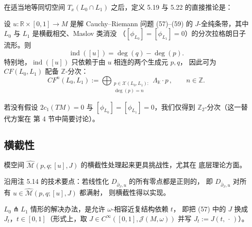 在适当地等同切空间 $T_x(L_0\cap L_1)$ 之后，定义 5.19 与 5.22 的直接推论是：

\begin{Cor}\label{cor:5.23}
设 $u:\mathbb R\times[0,1]\to M$ 是解 Cauchy--Riemann 问题 (57)--(59) 的
$J$-全纯条带，其中 $L_0$ 与 $L_1$ 是横截相交、Maslov 类消没
（$[\phi_{L_0}]=[\phi_{L_1}]=0$）的分次拉格朗日子流形。则
\[
\operatorname{ind}([u])=\deg(q)-\deg(p).
\]
特别地，$\operatorname{ind}([u])$ 只依赖于由 $u$ 相连的两个生成元 $p,q$，
因此可为 $CF(L_0,L_1)$ 配备 $\mathbb Z$-分次：
\[
CF^n(L_0,L_1):=\bigoplus_{\substack{p\in\mathcal X(L_0,L_1):\\
\deg(p)=n}}\Lambda_{\mathbb K}\cdot p\,,
\qquad n\in\mathbb Z.
\]
\end{Cor}


若没有假设 $2c_1(TM)=0$ 与 $[\phi_{L_0}]=[\phi_{L_1}]=0$，我们仅得到
$\mathbb Z_2$-分次（这一替代方案在 \cite{Sei99} 第 4 节中简要讨论）。

\medskip
\noindent{}
\medskip

\subsection{横截性}\label{sec:5.5}

模空间 $\widehat{\mathcal M}(p,q;[u],J)$ 的横截性处理起来更具挑战性，尤其在
底层理论方面。

\begin{Rem}\label{rem:5.24}
沿用注 5.14 的技术要点：若线性化 $D_{\bar\partial_J,u}$ 的所有零点都是正则的，
即 $D_{\bar\partial_J,u}$ 对所有 $u\in\widehat{\mathcal M}(p,q;[u],J)$ 都满射，
则横截性得以实现。
\end{Rem}

$L_0\pitchfork L_1$ 情形的解决办法，是允许 $\omega$-相容近复结构依赖 $t$，
即把 (57) 中的 $J$ 换成 $J_t$，$t\in[0,1]$（形式上，取
$J\in C^\infty([0,1],\mathcal J(M,\omega))$ 并写 $J_t:=J(t,\,\cdot\,)$）。

